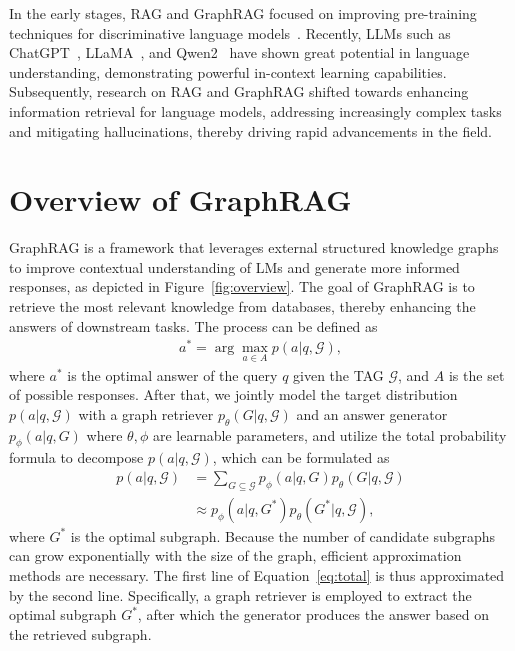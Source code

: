 \documentclass[acmsmall]{acmart}
\begin{document}
In the early stages, RAG and GraphRAG focused on improving pre-training techniques for discriminative language models~\cite{ref:bert,ref:roberta,ref:sentence-bert}. Recently, LLMs such as ChatGPT~\cite{ref:chatgpt}, LLaMA~\cite{ref:llama3}, and Qwen2~\cite{ref:qwen2} have shown great potential in language understanding, demonstrating powerful in-context learning capabilities. Subsequently, research on RAG and GraphRAG shifted towards enhancing information retrieval for language models, addressing increasingly complex tasks and mitigating hallucinations, thereby driving rapid advancements in the field. 

\section{Overview of GraphRAG}
GraphRAG is a framework that leverages external structured knowledge graphs to improve contextual understanding of LMs and generate more informed responses, as depicted in Figure~\ref{fig:overview}. The goal of GraphRAG is to retrieve the most relevant knowledge from databases, thereby enhancing the answers of downstream tasks. The process can be defined as
\begin{equation}
    \begin{aligned}
        a^* = \arg\max_{a \in A} p(a|q,\mathcal{G}),
    \end{aligned}
\end{equation}
where $a^*$ is the optimal answer of the query $q$ given the TAG $\mathcal{G}$, and $A$ is the set of possible responses. After that, we jointly model the target distribution $p(a|q,\mathcal{G})$ with a graph retriever $p_\theta(G|q,\mathcal{G})$ and an answer generator $p_\phi (a|q,G)$ where $\theta, \phi$ are learnable parameters, and utilize the total probability formula to decompose $p(a|q,\mathcal{G})$, which can be formulated as
\begin{equation}
    \begin{aligned}
    p(a|q,\mathcal{G}) &= \sum\limits_{G \subseteq \mathcal{G}} p_\phi (a|q,G) p_\theta(G|q,\mathcal{G}) \\
        &\approx p_\phi (a|q,G^*) p_\theta(G^*|q,\mathcal{G}),
    \end{aligned}
    \label{eq:total}
\end{equation}
where $G^*$ is the optimal subgraph. Because the number of candidate subgraphs can grow exponentially with the size of the graph, efficient approximation methods are necessary. The first line of Equation~\ref{eq:total} is thus approximated by the second line. Specifically, a graph retriever is employed to extract the optimal subgraph $G^*$, after which the generator produces the answer based on the retrieved subgraph.
\end{document}
